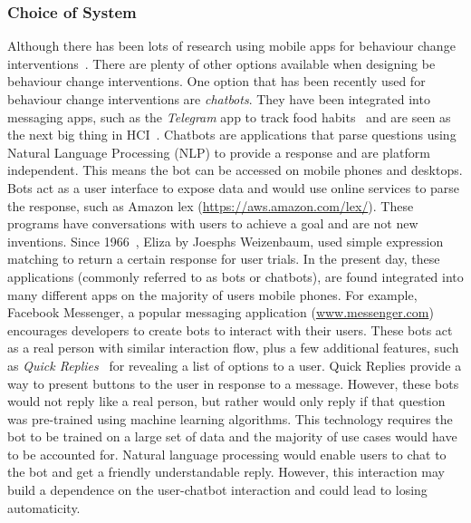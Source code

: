 \subsubsection*{Choice of System}
Although there has been lots of research using mobile apps for behaviour change interventions~\cite{survey_on_current_apps_of_steel}. There are plenty of other options available when designing be behaviour change interventions. One option that has been recently used for behaviour change interventions are \textit{chatbots}. They have been integrated into messaging apps, such as the \textit{Telegram} app to track food habits~\cite{telegram_bot_tracking_habits} and are seen as the next big thing in HCI~\cite{chatbots_and_new_world_of_hci}. Chatbots are applications that parse questions using Natural Language Processing (NLP) to provide a response and are platform independent. This means the bot can be accessed on mobile phones and desktops. Bots act as a user interface to expose data and would use online services to parse the response, such as Amazon lex (\url{https://aws.amazon.com/lex/}). These programs have conversations with users to achieve a goal and are not new inventions. Since 1966~\cite{article_eliza}, Eliza by Joesphs Weizenbaum, used simple expression matching to return a certain response for user trials. In the present day, these applications (commonly referred to as bots or chatbots), are found integrated into many different apps on the majority of users mobile phones. For example, Facebook Messenger, a popular messaging application (\url{www.messenger.com}) encourages developers to create bots to interact with their users. These bots act as a real person with similar interaction flow, plus a few additional features, such as \textit{Quick Replies}~\cite{doc_fb_quick_replies} for revealing a list of options to a user. Quick Replies provide a way to present buttons to the user in response to a message. However, these bots would not reply like a real person, but rather would only reply if that question was pre-trained using machine learning algorithms. This technology requires the bot to be trained on a large set of data and the majority of use cases would have to be accounted for. Natural language processing would enable users to chat to the bot and get a friendly understandable reply. However, this interaction may build a dependence on the user-chatbot interaction and could lead to losing automaticity.


